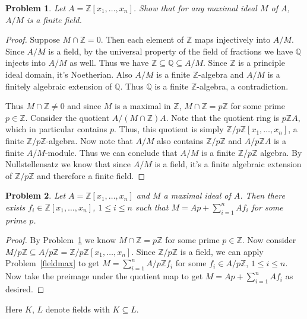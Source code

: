 \documentclass{article}
\newtheorem{problem}{Problem}
\begin{document}
\begin{problem}
\label{zmax}
Let $A = \mathbb{Z}[x_1, \dots , x_n]$. Show that for any maximal ideal $M$ of $A$, $A/M$ is a finite field.
\end{problem}
\begin{proof}
Suppose $M \cap \mathbb{Z} = 0$. Then each element of $\mathbb{Z}$ maps injectively into $A/M$. Since $A/M$ is a field, by the universal property of the field of fractions we have $\mathbb{Q}$ injects into $A/M$ as well. Thus we have $\mathbb{Z} \subseteq \mathbb{Q} \subseteq A/M$. Since $\mathbb{Z}$ is a principle ideal domain, it's Noetherian. Also $A/M$ is a finite $\mathbb{Z}$-algebra and $A/M$ is a finitely algebraic extension of $\mathbb{Q}$. Thus $\mathbb{Q}$ is a finite $\mathbb{Z}$-algebra, a contradiction.

Thus $M \cap \mathbb{Z} \neq 0$ and since $M$ is a maximal in $\mathbb{Z}$, $M \cap \mathbb{Z} = p \mathbb{Z}$ for some prime $p \in \mathbb{Z}$. Consider the quotient $A/(M \cap \mathbb{Z})A$. Note that the quotient ring is $p\mathbb{Z}A$, which in particular contains $p$. Thus, this quotient is simply $\mathbb{Z}/p\mathbb{Z}[x_1, \dots, x_n]$, a finite $\mathbb{Z}/p\mathbb{Z}$-algebra. Now note that $A/M$ also contains $\mathbb{Z}/p\mathbb{Z}$ and $A/p\mathbb{Z}A$ is a finite $A/M$-module. Thus we can conclude that $A/M$ is a finite $\mathbb{Z}/p\mathbb{Z}$ algebra. By Nullstellensatz we know that since $A/M$ is a field, it's a finite algebraic extension of $\mathbb{Z}/p\mathbb{Z}$ and therefore a finite field.
\end{proof}

\begin{problem}
Let $A = \mathbb{Z}[x_1, \dots , x_n]$ and $M$ a maximal ideal of $A$. Then there exists $f_i \in \mathbb{Z}[x_1, \dots , x_n]$, $1 \leq i \leq n$ such that $M = Ap + \sum_{i=1}^n A f_i$ for some prime $p$.
\end{problem}
\begin{proof}
By Problem~\ref{zmax} we know $M \cap \mathbb{Z} = p\mathbb{Z}$ for some prime $p \in \mathbb{Z}$. Now consider $M/p\mathbb{Z} \subseteq A/p\mathbb{Z} = \mathbb{Z}/p\mathbb{Z}[x_1, \dots , x_n]$. Since $\mathbb{Z}/p\mathbb{Z}$ is a field, we can apply Problem~\ref{fieldmax} to get $M = \sum_{i=1}^n A/p\mathbb{Z} f_i$ for some $f_i \in A/p\mathbb{Z}$, $1 \leq i \leq n$. Now take the preimage under the quotient map to get $M = Ap + \sum_{i=1}^n Af_i$ as desired.
\end{proof}

\noindent
Here $K$, $L$ denote fields with $K \subseteq L$.
\end{document}
